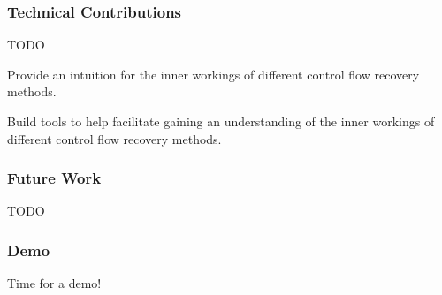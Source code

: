 \documentclass[aspectratio=1610]{beamer}
\begin{document}
\begin{frame}
	\frametitle{Technical Contributions}

	TODO

	Provide an intuition for the inner workings of different control flow recovery methods.

	Build tools to help facilitate gaining an understanding of the inner workings of different control flow recovery methods.


\end{frame}


\begin{frame}
	\frametitle{Future Work}


	TODO

%


\end{frame}

\begin{frame}
	\frametitle{Demo}



Time for a demo!


\end{frame}
\end{document}
